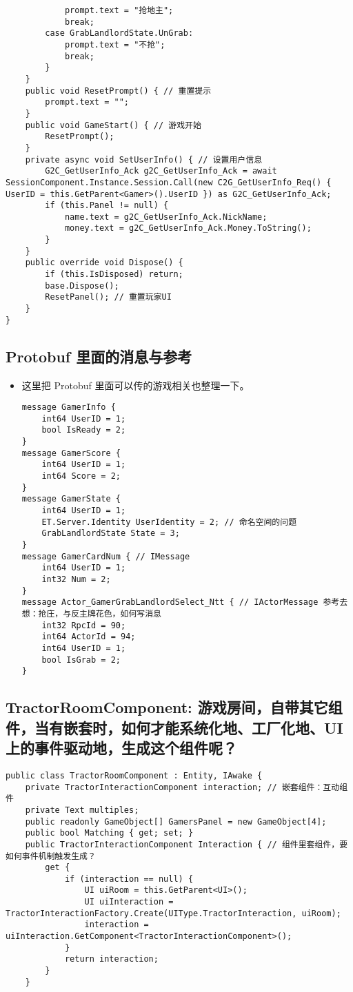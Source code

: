 \documentclass[9pt, b5paper]{article}
\begin{document}
\begin{verbatim}
            prompt.text = "抢地主";
            break;
        case GrabLandlordState.UnGrab:
            prompt.text = "不抢";
            break;
        }
    }
    public void ResetPrompt() { // 重置提示
        prompt.text = "";
    }
    public void GameStart() { // 游戏开始
        ResetPrompt();
    }
    private async void SetUserInfo() { // 设置用户信息
        G2C_GetUserInfo_Ack g2C_GetUserInfo_Ack = await SessionComponent.Instance.Session.Call(new C2G_GetUserInfo_Req() { UserID = this.GetParent<Gamer>().UserID }) as G2C_GetUserInfo_Ack;
        if (this.Panel != null) {
            name.text = g2C_GetUserInfo_Ack.NickName;
            money.text = g2C_GetUserInfo_Ack.Money.ToString();
        }
    }
    public override void Dispose() {
        if (this.IsDisposed) return;
        base.Dispose();
        ResetPanel(); // 重置玩家UI
    }
}
\end{verbatim}
\subsection{Protobuf 里面的消息与参考}
\label{sec-4-6}
\begin{itemize}
\item 这里把 Protobuf 里面可以传的游戏相关也整理一下。
\begin{verbatim}
message GamerInfo {
    int64 UserID = 1;
    bool IsReady = 2;
}
message GamerScore {
    int64 UserID = 1;
    int64 Score = 2;
}
message GamerState {
    int64 UserID = 1;
    ET.Server.Identity UserIdentity = 2; // 命名空间的问题
	GrabLandlordState State = 3;
}
message GamerCardNum { // IMessage
    int64 UserID = 1;
    int32 Num = 2;
}
message Actor_GamerGrabLandlordSelect_Ntt { // IActorMessage 参考去想：抢庄，与反主牌花色，如何写消息 
    int32 RpcId = 90;
    int64 ActorId = 94;
    int64 UserID = 1;
    bool IsGrab = 2;
}
\end{verbatim}
\end{itemize}
\subsection{TractorRoomComponent: 游戏房间，自带其它组件，当有嵌套时，如何才能系统化地、工厂化地、UI 上的事件驱动地，生成这个组件呢？}
\label{sec-4-7}
\begin{verbatim}
public class TractorRoomComponent : Entity, IAwake {
    private TractorInteractionComponent interaction; // 嵌套组件：互动组件
    private Text multiples;
    public readonly GameObject[] GamersPanel = new GameObject[4];
    public bool Matching { get; set; }
    public TractorInteractionComponent Interaction { // 组件里套组件，要如何事件机制触发生成？
        get {
            if (interaction == null) {
                UI uiRoom = this.GetParent<UI>();
                UI uiInteraction = TractorInteractionFactory.Create(UIType.TractorInteraction, uiRoom);
                interaction = uiInteraction.GetComponent<TractorInteractionComponent>();
            }
            return interaction;
        }
    }
\end{verbatim}
\end{document}
